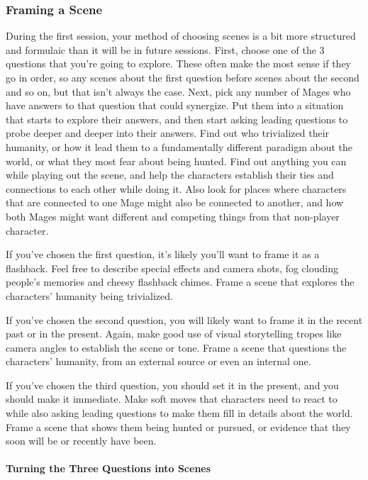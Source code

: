 \documentclass[
]{article}
\begin{document}
\hypertarget{framing-a-scene}{%
\subsubsection{Framing a Scene}\label{framing-a-scene}}

During the first session, your method of choosing scenes is a bit more
structured and formulaic than it will be in future sessions. First,
choose one of the 3 questions that you're going to explore. These often
make the most sense if they go in order, so any scenes about the first
question before scenes about the second and so on, but that isn't always
the case. Next, pick any number of Mages who have answers to that
question that could synergize. Put them into a situation that starts to
explore their answers, and then start asking leading questions to probe
deeper and deeper into their answers. Find out who trivialized their
humanity, or how it lead them to a fundamentally different paradigm
about the world, or what they most fear about being hunted. Find out
anything you can while playing out the scene, and help the characters
establish their ties and connections to each other while doing it. Also
look for places where characters that are connected to one Mage might
also be connected to another, and how both Mages might want different
and competing things from that non-player character.

If you've chosen the first question, it's likely you'll want to frame it
as a flashback. Feel free to describe special effects and camera shots,
fog clouding people's memories and cheesy flashback chimes. Frame a
scene that explores the characters' humanity being trivialized.

If you've chosen the second question, you will likely want to frame it
in the recent past or in the present. Again, make good use of visual
storytelling tropes like camera angles to establish the scene or tone.
Frame a scene that questions the characters' humanity, from an external
source or even an internal one.

If you've chosen the third question, you should set it in the present,
and you should make it immediate. Make soft moves that characters need
to react to while also asking leading questions to make them fill in
details about the world. Frame a scene that shows them being hunted or
pursued, or evidence that they soon will be or recently have been.

\hypertarget{turning-the-three-questions-into-scenes}{%
\paragraph{Turning the Three Questions into
Scenes}\label{turning-the-three-questions-into-scenes}}
\end{document}
